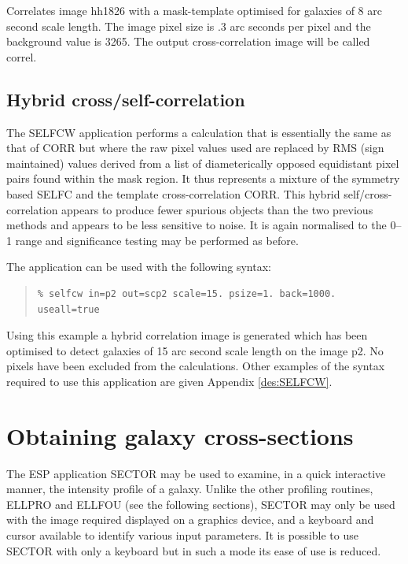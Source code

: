 \documentclass[twoside,11pt]{article}
\newcommand{\xlabel}[1]{}
\newenvironment{myquote}{\begin{quote}\begin{small}}{\end{small}\end{quote}}
\begin{document}
Correlates image hh1826 with a mask-template optimised for galaxies of
8 arc second scale length. The image pixel size is .3 arc seconds
per pixel and the background value is 3265. The
output cross-correlation image will be called correl.

\subsection{Hybrid cross/self-correlation}

The SELFCW application performs a calculation that is essentially the same
as that of CORR but where the raw pixel values used are replaced by RMS
(sign maintained) values derived from a list of diameterically opposed
equidistant pixel pairs found within the mask region. It thus
represents a mixture of the symmetry based SELFC and the template
cross-correlation CORR. This hybrid self/cross-correlation appears
to produce fewer spurious objects than the two previous methods and
appears to be less sensitive to noise. It is again normalised to the
0--1 range and significance testing may be performed as
before.

The application can be used with the following syntax:

\begin{myquote}
\begin{verbatim}
% selfcw in=p2 out=scp2 scale=15. psize=1. back=1000. useall=true
\end{verbatim}
\end{myquote}

Using this example a hybrid correlation image is generated which has been
optimised to detect galaxies of 15 arc second scale length on the
image p2. No pixels have been excluded from the calculations.
Other examples of the syntax required to use this application are given
Appendix \ref{des:SELFCW}.


\section{Obtaining galaxy cross-sections}
\xlabel{SECTOR}
\label{sec:obtaining}

The ESP application SECTOR may be used to examine, in a quick
interactive manner, the intensity profile of a galaxy. Unlike the
other profiling routines, ELLPRO and ELLFOU (see the following sections),
SECTOR may only be used with the image required displayed on a graphics
device, and a keyboard and cursor available to identify various input
parameters. It is possible to use SECTOR with only a keyboard but in
such a mode its ease of use is reduced.
\end{document}
